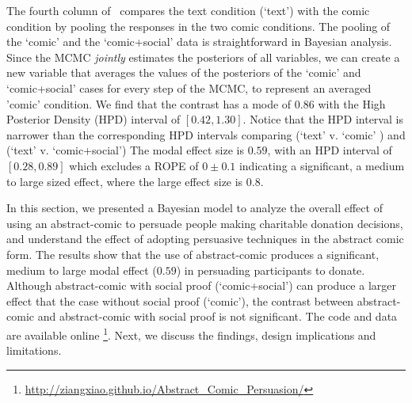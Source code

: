 The fourth column of~ compares the text condition (`text') with the comic condition by pooling the responses in the two comic conditions. The pooling of the `comic' and the `comic+social' data is straightforward in Bayesian analysis. Since the MCMC \textit{jointly} estimates the posteriors of all variables, we can create a new variable that averages the values of the posteriors of the `comic' and `comic+social' cases for every step of the MCMC, to represent an averaged 'comic' condition.  We find that the contrast has a mode of $0.86$ with the High Posterior Density (HPD) interval of $[0.42, 1.30]$. Notice that the HPD interval is narrower than the corresponding HPD intervals comparing (`text' v. `comic' ) and (`text' v. `comic+social') The modal effect size is $0.59$, with an HPD interval of $[0.28, 0.89]$ which excludes a ROPE of $0 \pm 0.1$ indicating a significant, a medium to large sized effect, where the large effect size is $0.8$. 

In this section, we presented a Bayesian model to analyze the overall effect of using an abstract-comic to persuade people making charitable donation decisions, and understand the effect of adopting persuasive techniques in the abstract comic form. The results show that the use of abstract-comic produces a significant, medium to large modal effect ($0.59$) in persuading participants to donate. Although abstract-comic with social proof (`comic+social') can produce a larger effect that the case without social proof (`comic'), the contrast between abstract-comic and abstract-comic with social proof is not significant. The code and data are available online \footnote{\url{http://ziangxiao.github.io/Abstract_Comic_Persuasion/}}. Next, we discuss the findings, design implications and limitations.
